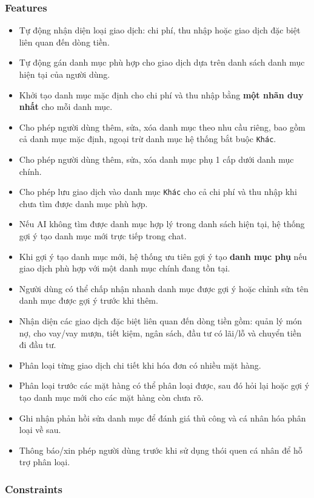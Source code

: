 \subsubsection{Features}

\begin{itemize}
\item Tự động nhận diện loại giao dịch: chi phí, thu nhập hoặc giao dịch đặc biệt liên quan đến dòng tiền.
\item Tự động gán danh mục phù hợp cho giao dịch dựa trên danh sách danh mục hiện tại của người dùng.
\item Khởi tạo danh mục mặc định cho chi phí và thu nhập bằng \textbf{một nhãn duy nhất} cho mỗi danh mục.
\item Cho phép người dùng thêm, sửa, xóa danh mục theo nhu cầu riêng, bao gồm cả danh mục mặc định, ngoại trừ danh mục hệ thống bắt buộc \texttt{Khác}.
\item Cho phép người dùng thêm, sửa, xóa danh mục phụ 1 cấp dưới danh mục chính.
\item Cho phép lưu giao dịch vào danh mục \texttt{Khác} cho cả chi phí và thu nhập khi chưa tìm được danh mục phù hợp.
\item Nếu AI không tìm được danh mục hợp lý trong danh sách hiện tại, hệ thống gợi ý tạo danh mục mới trực tiếp trong chat.
\item Khi gợi ý tạo danh mục mới, hệ thống ưu tiên gợi ý tạo \textbf{danh mục phụ} nếu giao dịch phù hợp với một danh mục chính đang tồn tại.
\item Người dùng có thể chấp nhận nhanh danh mục được gợi ý hoặc chỉnh sửa tên danh mục được gợi ý trước khi thêm.
\item Nhận diện các giao dịch đặc biệt liên quan đến dòng tiền gồm: quản lý món nợ, cho vay/vay mượn, tiết kiệm, ngân sách, đầu tư có lãi/lỗ và chuyển tiền đi đầu tư.
\item Phân loại từng giao dịch chi tiết khi hóa đơn có nhiều mặt hàng.
\item Phân loại trước các mặt hàng có thể phân loại được, sau đó hỏi lại hoặc gợi ý tạo danh mục mới cho các mặt hàng còn chưa rõ.
\item Ghi nhận phản hồi sửa danh mục để đánh giá thủ công và cá nhân hóa phân loại về sau.
\item Thông báo/xin phép người dùng trước khi sử dụng thói quen cá nhân để hỗ trợ phân loại.
\end{itemize}
\subsubsection{Constraints}

